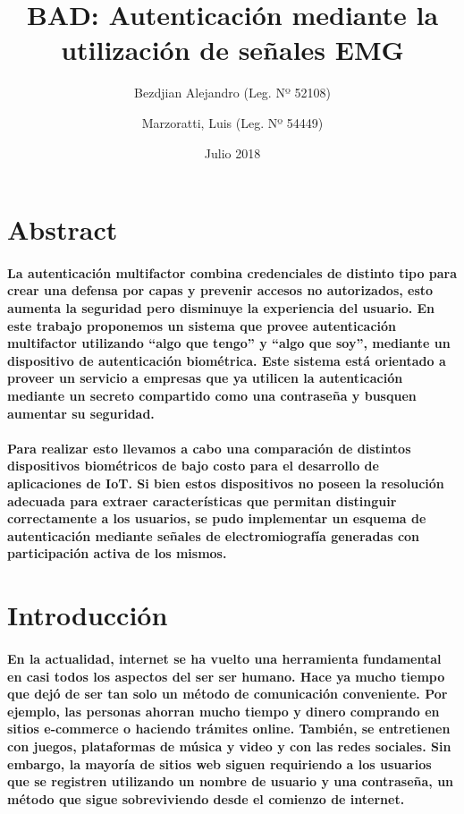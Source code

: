 \documentclass{article}
\title{BAD: Autenticación mediante la utilización de señales EMG}
\author{
    Bezdjian Alejandro (Leg. Nº 52108) \\
    \and
    Marzoratti, Luis (Leg. Nº 54449)
}
\date{Julio 2018}
\begin{document}
\maketitle
\thispagestyle{empty}
\clearpage
\tableofcontents
\clearpage

\section{Abstract}

\paragraph{
La autenticación multifactor combina credenciales de distinto tipo para crear una defensa por capas y prevenir accesos no autorizados, esto aumenta la seguridad pero disminuye la experiencia del usuario. En este trabajo proponemos un sistema que provee autenticación multifactor utilizando ``algo que tengo'' y ``algo que soy'', mediante un dispositivo de autenticación biométrica. Este sistema está orientado a proveer un servicio a empresas que ya utilicen la autenticación mediante un secreto compartido como una contraseña y busquen aumentar su seguridad.
}
\paragraph{
Para realizar esto llevamos a cabo una comparación de distintos dispositivos biométricos de bajo costo para el desarrollo de aplicaciones de IoT. Si bien estos dispositivos no poseen la resolución adecuada para extraer características que permitan distinguir correctamente a los usuarios, se pudo implementar un esquema de autenticación mediante señales de electromiografía generadas con participación activa de los mismos.
}

\section{Introducción}
\paragraph{
En la actualidad, internet se ha vuelto una herramienta fundamental en casi todos los aspectos del ser ser humano. Hace ya mucho tiempo que dejó de ser tan solo un método de comunicación conveniente. Por ejemplo, las personas ahorran mucho tiempo y dinero comprando en sitios e-commerce o haciendo trámites online. También, se entretienen con juegos, plataformas de música y video y con las redes sociales. Sin embargo, la mayoría de sitios web siguen requiriendo a los usuarios que se registren utilizando un nombre de usuario y una contraseña, un método que sigue sobreviviendo desde el comienzo de internet.
}
\end{document}
